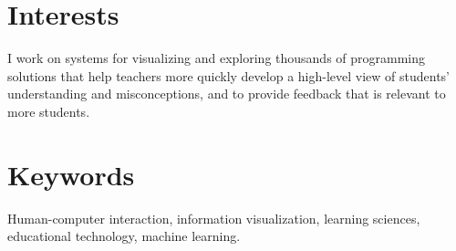 \documentclass[margin]{res}
\begin{document}
 

 
\address{32 Vassar Street, Rm 32-G715\\Cambridge, MA 02139}
\address{ELG@MIT.edu\\
(215) 694-9631} 

 
\begin{resume} 
 
\section{Interests} 
I work on systems for visualizing and exploring thousands of programming solutions that help teachers more quickly develop a high-level view of students' understanding and misconceptions, and to provide feedback that is relevant to more students. 

\section{Keywords} 
Human-computer interaction, information visualization, learning sciences, educational technology, machine learning.


\end{resume}
\end{document}
